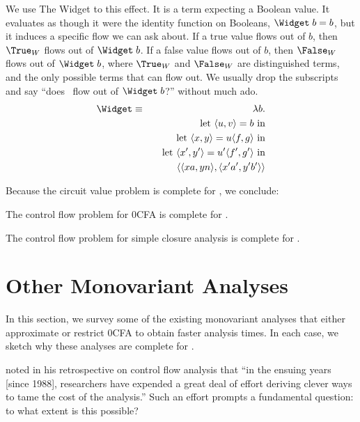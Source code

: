 We use The Widget to this effect.  It is a term expecting a Boolean
value.  It evaluates as though it were the identity function on
Booleans, $\Widget\; b = b$, but it induces a specific flow we can ask
about. If a true value flows out of $b$, then $\True_W$ flows out of
$\Widget\; b$.  If a false value flows out of $b$, then $\False_W$
flows out of $\Widget\; b$, where $\True_W$ and $\False_W$ are
distinguished terms, and the only possible terms that can flow out.
We usually drop the subscripts and say ``does \True\ flow out of
$\Widget\; b$?''  without much ado.
\begin{eqnarray*}
\Widget & \equiv & \lambda b.\\
\ & \ & \quad \mbox{let }\langle u,v\rangle = b\mbox{ in}\\
\ & \ & \quad \mbox{let }\langle x,y\rangle = u\langle f,g\rangle\mbox{ in}\\
\ & \ & \quad \mbox{let }\langle x',y'\rangle = u'\langle f',g'\rangle\mbox{ in}\\
\ & \ & \qquad \langle\langle x a, y n\rangle, \langle x' a', y' b'\rangle\rangle
\end{eqnarray*}



Because the circuit value problem is complete for \ptime, we
conclude:

\begin{theorem}
The control flow problem for 0CFA is complete for \ptime.
\end{theorem}

\begin{corollary}
The control flow problem for simple closure analysis is complete for \ptime.
\end{corollary}

\section{Other Monovariant Analyses}

In this section, we survey some of the existing monovariant analyses
that either approximate or restrict 0CFA to obtain faster analysis
times.  In each case, we sketch why these analyses are complete for
\ptime.

\citet{shivers-sigplan04} noted in his retrospective on control flow
analysis that ``in the ensuing years [since 1988], researchers have
expended a great deal of effort deriving clever ways to tame the cost
of the analysis.''  Such an effort prompts a fundamental question: to
what extent is this possible?

